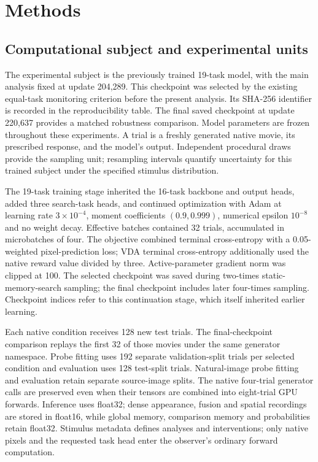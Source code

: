 \documentclass[11pt]{article}
\begin{document}
\section{Methods}
\subsection{Computational subject and experimental units}
The experimental subject is the previously trained 19-task model, with the main analysis fixed at update 204,289. This checkpoint was selected by the existing equal-task monitoring criterion before the present analysis. Its SHA-256 identifier is recorded in the reproducibility table. The final saved checkpoint at update 220,637 provides a matched robustness comparison. Model parameters are frozen throughout these experiments. A trial is a freshly generated native movie, its prescribed response, and the model's output. Independent procedural draws provide the sampling unit; resampling intervals quantify uncertainty for this trained subject under the specified stimulus distribution.

The 19-task training stage inherited the 16-task backbone and output heads, added three search-task heads, and continued optimization with Adam at learning rate $3\times10^{-4}$, moment coefficients $(0.9,0.999)$, numerical epsilon $10^{-8}$ and no weight decay. Effective batches contained 32 trials, accumulated in microbatches of four. The objective combined terminal cross-entropy with a 0.05-weighted pixel-prediction loss; VDA terminal cross-entropy additionally used the native reward value divided by three. Active-parameter gradient norm was clipped at 100. The selected checkpoint was saved during two-times static-memory-search sampling; the final checkpoint includes later four-times sampling. Checkpoint indices refer to this continuation stage, which itself inherited earlier learning.

Each native condition receives 128 new test trials. The final-checkpoint comparison replays the first 32 of those movies under the same generator namespace. Probe fitting uses 192 separate validation-split trials per selected condition and evaluation uses 128 test-split trials. Natural-image probe fitting and evaluation retain separate source-image splits. The native four-trial generator calls are preserved even when their tensors are combined into eight-trial GPU forwards. Inference uses float32; dense appearance, fusion and spatial recordings are stored in float16, while global memory, comparison memory and probabilities retain float32. Stimulus metadata defines analyses and interventions; only native pixels and the requested task head enter the observer's ordinary forward computation.
\end{document}
